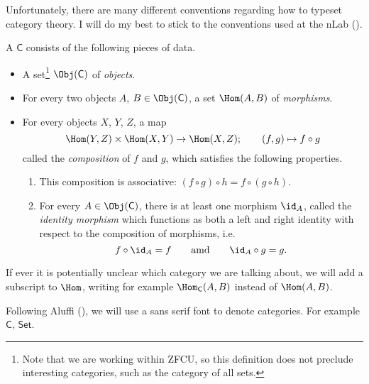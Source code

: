 \documentclass[notes.tex]{subfiles}
\begin{document}
Unfortunately, there are many different conventions regarding how to typeset category theory. I will do my best to stick to the conventions used at the nLab (\cite{nlab}).

\begin{definition}[category]
  \label{def:category}
  A  $\mathsf{C}$ consists of the following pieces of data.
  \begin{itemize}
    \item A set\footnote{Note that we are working within ZFCU, so this definition does not preclude interesting categories, such as the category of all sets.} $\Obj(\mathsf{C})$ of \emph{objects}.

    \item For every two objects $A$, $B \in \Obj(\mathsf{C})$, a set $\Hom(A,B)$ of \emph{morphisms\/}.

    \item\label{item:compositionofmorphisms} 
      For every objects $X$, $Y$, $Z$, a map 
      \begin{equation*}
        \Hom(Y, Z) \times \Hom(X, Y) \to \Hom(X, Z);\qquad (f, g) \mapsto f \circ g
      \end{equation*}
      called the \emph{composition\/} of $f$ and $g$, which satisfies the following properties.
      \begin{enumerate}
        \item This composition is associative: $(f \circ g) \circ h = f \circ (g \circ h)$.

        \item\label{item:existenceofidentitymorphism} For every $A \in \Obj(\mathsf{C})$, there is at least one morphism $\id_{A}$, called the \emph{identity morphism\/} which functions as both a left and right identity with respect to the composition of morphisms, i.e.\
          \begin{equation*}
            f \circ \id_{A} = f\qquad\text{amd}\qquad \id_{A} \circ g = g.
          \end{equation*}
      \end{enumerate}
  \end{itemize}

  If ever it is potentially unclear which category we are talking about, we will add a subscript to $\Hom$, writing for example $\Hom_{\mathsf{C}}(A,B)$ instead of $\Hom(A,B)$.
\end{definition}

\begin{notation}
  Following Aluffi (\cite{aluffi-algebra-chapter-0}), we will use a sans serif font to denote categories. For example $\mathsf{C}$, $\mathsf{Set}$.
\end{notation}
\end{document}
